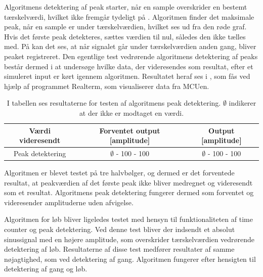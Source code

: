 Algoritmens detektering af peak starter, når en sample overskrider en bestemt tærskelværdi, hvilket ikke fremgår tydeligt på . Algoritmen finder det maksimale peak, når en sample er under tærskelværdien, hvilket ses ud fra den røde graf. Hvis det første peak detekteres, sættes værdien til nul, således den ikke tælles med. På  kan det ses, at når signalet går under tærskelværdien anden gang, bliver peaket registreret. Den egentlige test vedrørende algoritmens detektering af peaks består dermed i at undersøge hvilke data, der videresendes som resultat, efter et simuleret input er kørt igennem algoritmen. Resultatet heraf ses i , som fås ved hjælp af programmet Realterm, som visualiserer data fra MCUen.
\begin{table}[H]
	\centering
	\begin{tabular}{ccc}
		\hline
		\rowcolor[HTML]{C0C0C0} 
		Værdi videresendt & Forventet output [amplitude] & Output [amplitude] \\ \hline
		Peak detektering & $\emptyset$ - 100 - 100 & $\emptyset$ - 100 - 100 \\ \hline
	\end{tabular}
	\caption{I tabellen ses resultaterne for testen af algoritmens peak detektering. $\emptyset$ indikerer at der ikke er modtaget en værdi.}
	\label{tab:test_res_peak}
\end{table}\vspace{-0.25cm}
Algoritmen er blevet testet på tre halvbølger, og dermed er det forventede resultat, at peakværdien af det første peak ikke bliver medregnet og videresendt som et resultat. Algoritmens peak detektering fungerer dermed som forventet og videresender amplituderne uden afvigelse.

Algoritmen for løb bliver ligeledes testet med hensyn til funktionaliteten af time counter og peak detektering. Ved denne test bliver der indsendt et absolut sinussignal med en højere amplitude, som overskrider tærskelværdien vedrørende detektering af løb. Resultaterne af disse test medfører resultater af samme nøjagtighed, som ved detektering af gang. Algoritmen fungerer efter hensigten til detektering af gang og løb.

